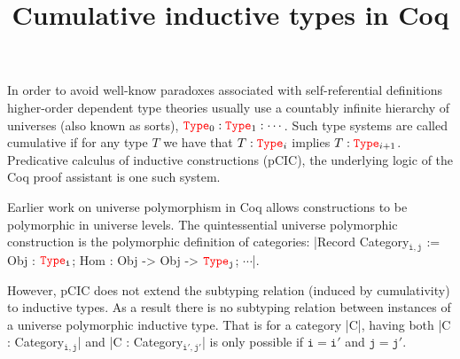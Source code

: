 \documentclass{easychair}
\title{Cumulative inductive types in Coq}
\author{
}
\institute{
 }
\newcommand{\Type}[1]{{\color{red} \mathtt{Type}}_{#1}}
\begin{document}
\maketitle

In order to avoid well-know paradoxes associated with self-referential
definitions higher-order dependent type theories usually use a
countably infinite hierarchy of universes (also known as sorts),
$\Type{0} : \Type{1} : \cdots$. Such type systems are called
cumulative if for any type $T$ we have that $T : \Type{i}$ implies
$T : \Type{i+1}$. Predicative calculus of inductive constructions
(pCIC), the underlying logic of the Coq proof assistant is one such
system.

Earlier work \cite{DBLP:conf/itp/SozeauT14} on universe polymorphism
in Coq allows constructions to be polymorphic in universe levels.  The
quintessential universe polymorphic construction is the polymorphic definition of
categories:
\Coqe|Record Category$_{\mathtt{i, j}}$ := {Obj : $\Type{\mathtt{i}}$; Hom : Obj -> Obj -> $\Type{\mathtt{j}}$; $\cdots$}|.\footnotemark{}

However, pCIC does not extend the subtyping relation (induced by
cumulativity) to inductive types. As a result there is no subtyping
relation between instances of a universe polymorphic inductive type.
That is for a category \Coqe|C|, having both
\Coqe|C : Category$_{\mathtt{i, j}}$| and \Coqe|C : Category$_{\mathtt{i', j'}}$|
is only possible if $\mathtt{i = i'}$ and $\mathtt{j = j'}$.
\end{document}
